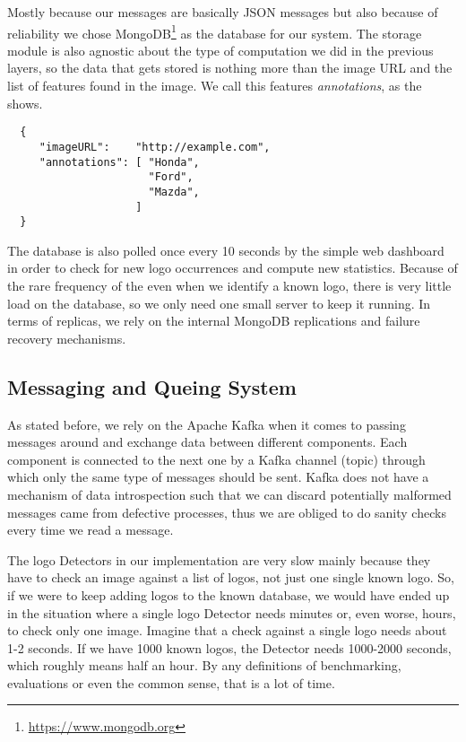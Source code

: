 Mostly because our messages are basically JSON messages but also because of
reliability we chose MongoDB\footnote{\url{https://www.mongodb.org}} as the
database for our system. The storage module is also agnostic about the type of
computation we did in the previous layers, so the data that gets stored is
nothing more than the image URL and the list of features found in the image.
We call this features \textit{annotations}, as the
 shows.

\lstset{caption=MongoDB Document,label=lst:mongo-json}
\begin{lstlisting}
  {
     "imageURL":    "http://example.com",
     "annotations": [ "Honda",
                      "Ford",
                      "Mazda",
                    ]
  }
\end{lstlisting}

The database is also polled once every 10 seconds by the simple web dashboard
in order to check for new logo occurrences and compute new statistics. Because
of the rare frequency of the even when we identify a known logo, there is very
little load on the database, so we only need one small server to keep it
running. In terms of replicas, we rely on the internal MongoDB replications
and failure recovery mechanisms.

\subsection{Messaging and Queing System}
\label{sub-sec:q-system}

As stated before, we rely on the Apache Kafka when it comes to passing
messages around and exchange data between different components. Each component
is connected to the next one by a Kafka channel (topic) through which only the
same type of messages should be sent. Kafka does not have a mechanism of data
introspection such that we can discard potentially malformed messages came from
defective processes, thus we are obliged to do sanity checks every time we
read a message.

The logo Detectors in our implementation are very slow
mainly because they have to check an image against a list of logos, not just
one single known logo. So, if we were to keep adding logos to the known
database, we would have ended up in the situation where a single logo Detector
needs minutes or, even worse, hours, to check only one image. Imagine that a
check against a single logo needs about
1-2 seconds. If we have 1000 known logos, the Detector needs 1000-2000
seconds,  which roughly means half an hour. By any definitions of
benchmarking, evaluations or even the common sense, that is a lot of
time.

